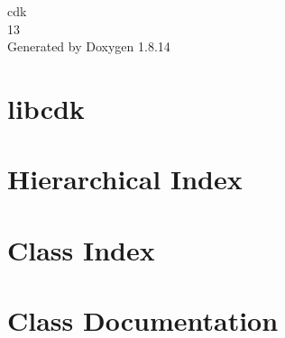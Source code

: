 \documentclass[twoside]{book}
\newcommand{\+}{\discretionary{\mbox{\scriptsize$\hookleftarrow$}}{}{}}
\newcommand{\clearemptydoublepage}{%
  \newpage{\pagestyle{empty}\cleardoublepage}%
}
\begin{document}
\begin{titlepage}
\vspace*{7cm}
\begin{center}%
{\Large cdk \\[1ex]\large 13 }\\
\vspace*{1cm}
{\large Generated by Doxygen 1.8.14}\\
\end{center}
\end{titlepage}
\clearemptydoublepage
{}
\tableofcontents
\clearemptydoublepage
{}

\chapter{libcdk}
\label{md_README}

\chapter{Hierarchical Index}

\chapter{Class Index}

\chapter{Class Documentation}















































\backmatter
\newpage
{}
\clearemptydoublepage
{}
\printindex
\end{document}
